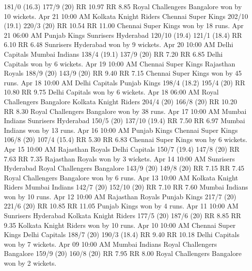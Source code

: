 181/0 (16.3)
177/9 (20)
RR 10.97
RR 8.85
Royal Challengers Bangalore won by 10 wickets.
Apr 21
10:00 AM
Kolkata Knight Riders
Chennai Super Kings
202/10 (19.1)
220/3 (20)
RR 10.54
RR 11.00
Chennai Super Kings won by 18 runs.
Apr 21
06:00 AM
Punjab Kings
Sunrisers Hyderabad
120/10 (19.4)
121/1 (18.4)
RR 6.10
RR 6.48
Sunrisers Hyderabad won by 9 wickets.
Apr 20
10:00 AM
Delhi Capitals
Mumbai Indians
138/4 (19.1)
137/9 (20)
RR 7.20
RR 6.85
Delhi Capitals won by 6 wickets.
Apr 19
10:00 AM
Chennai Super Kings
Rajasthan Royals
188/9 (20)
143/9 (20)
RR 9.40
RR 7.15
Chennai Super Kings won by 45 runs.
Apr 18
10:00 AM
Delhi Capitals
Punjab Kings
198/4 (18.2)
195/4 (20)
RR 10.80
RR 9.75
Delhi Capitals won by 6 wickets.
Apr 18
06:00 AM
Royal Challengers Bangalore
Kolkata Knight Riders
204/4 (20)
166/8 (20)
RR 10.20
RR 8.30
Royal Challengers Bangalore won by 38 runs.
Apr 17
10:00 AM
Mumbai Indians
Sunrisers Hyderabad
150/5 (20)
137/10 (19.4)
RR 7.50
RR 6.97
Mumbai Indians won by 13 runs.
Apr 16
10:00 AM
Punjab Kings
Chennai Super Kings
106/8 (20)
107/4 (15.4)
RR 5.30
RR 6.83
Chennai Super Kings won by 6 wickets.
Apr 15
10:00 AM
Rajasthan Royals
Delhi Capitals
150/7 (19.4)
147/8 (20)
RR 7.63
RR 7.35
Rajasthan Royals won by 3 wickets.
Apr 14
10:00 AM
Sunrisers Hyderabad
Royal Challengers Bangalore
143/9 (20)
149/8 (20)
RR 7.15
RR 7.45
Royal Challengers Bangalore won by 6 runs.
Apr 13
10:00 AM
Kolkata Knight Riders
Mumbai Indians
142/7 (20)
152/10 (20)
RR 7.10
RR 7.60
Mumbai Indians won by 10 runs.
Apr 12
10:00 AM
Rajasthan Royals
Punjab Kings
217/7 (20)
221/6 (20)
RR 10.85
RR 11.05
Punjab Kings won by 4 runs.
Apr 11
10:00 AM
Sunrisers Hyderabad
Kolkata Knight Riders
177/5 (20)
187/6 (20)
RR 8.85
RR 9.35
Kolkata Knight Riders won by 10 runs.
Apr 10
10:00 AM
Chennai Super Kings
Delhi Capitals
188/7 (20)
190/3 (18.4)
RR 9.40
RR 10.18
Delhi Capitals won by 7 wickets.
Apr 09
10:00 AM
Mumbai Indians
Royal Challengers Bangalore
159/9 (20)
160/8 (20)
RR 7.95
RR 8.00
Royal Challengers Bangalore won by 2 wickets.